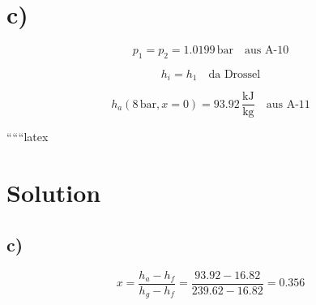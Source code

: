 

\section*{c)}

\[
p_1 = p_2 = 1.0199 \, \text{bar} \quad \text{aus A-10}
\]

\[
h_i = h_1 \quad \text{da Drossel}
\]

\[
h_a (8 \, \text{bar}, x = 0) = 93.92 \, \frac{\text{kJ}}{\text{kg}} \quad \text{aus A-11}
\]

``````latex


\section*{Solution}



\subsection*{c)}
\[
x = \frac{h_a - h_f}{h_g - h_f} = \frac{93.92 - 16.82}{239.62 - 16.82} = 0.356
\]